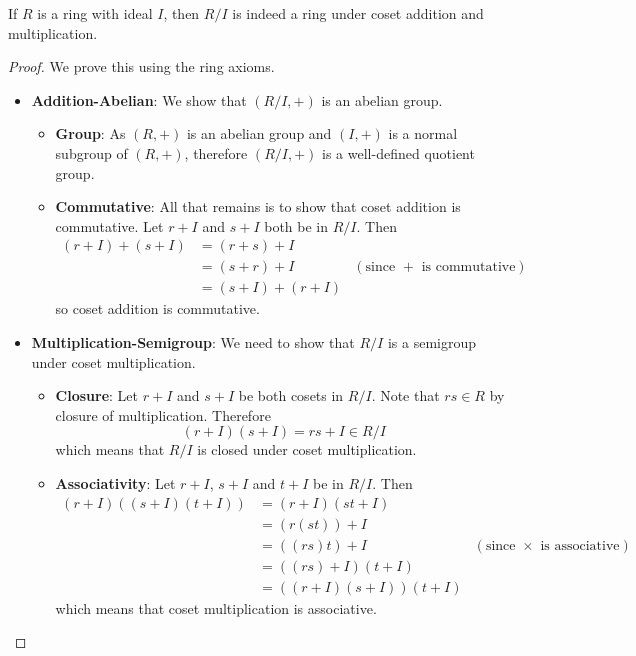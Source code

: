 \begin{proposition}
    If $R$ is a ring with ideal $I$, then $R/I$ is indeed a ring under coset addition and multiplication.
\end{proposition}
\begin{proof}
    We prove this using the ring axioms.
    \begin{itemize}
        \item \textbf{Addition-Abelian}: We show that $(R/I,+)$ is an abelian group.
        \begin{itemize}
            \item \textbf{Group}: As $(R,+)$ is an abelian group and $(I,+)$ is a normal subgroup of $(R,+)$, therefore $(R/I,+)$ is a well-defined quotient group.
            \item \textbf{Commutative}: All that remains is to show that coset addition is commutative. Let $r+I$ and $s+I$ both be in $R/I$. Then
            \begin{align*}
                (r+I) + (s+I) &= (r+s)+I\\
                &= (s+r) + I & (\text{since } + \text{ is commutative})\\
                &= (s+I) + (r+I)
            \end{align*}
            so coset addition is commutative.
        \end{itemize}
        \item \textbf{Multiplication-Semigroup}: We need to show that $R/I$ is a semigroup under coset multiplication.
        \begin{itemize}
            \item \textbf{Closure}: Let $r+I$ and $s+I$ be both cosets in $R/I$. Note that $rs \in R$ by closure of multiplication. Therefore
            \[
                (r+I)(s+I) = rs+I \in R/I
            \]
            which means that $R/I$ is closed under coset multiplication.

            \item \textbf{Associativity}: Let $r+I$, $s+I$ and $t+I$ be in $R/I$. Then
            \begin{align*}
                (r+I)((s+I)(t+I)) &= (r+I)(st+I)\\
                &= (r(st))+I\\
                &= ((rs)t) + I & (\text{since } \times \text{ is associative})\\
                &= ((rs)+I)(t+I)\\
                &= ((r+I)(s+I))(t+I)
            \end{align*}
            which means that coset multiplication is associative.


\end{itemize}
\end{itemize}
\end{proof}
